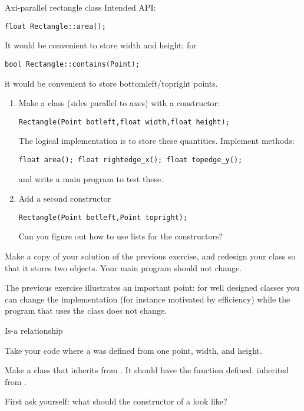 \begin{block}{Axi-parallel rectangle class}
  \label{ex:geom:rect}
  Intended API:
\begin{lstlisting}
float Rectangle::area();
\end{lstlisting}
It would be convenient to store width and height; for 
\begin{lstlisting}
bool Rectangle::contains(Point);  
\end{lstlisting}
it would be convenient to store bottomleft/topright points.
\end{block}

\begin{exercise}
  \label{ex:geom:rect2}
  \footnotesize
  \begin{enumerate}
  \item
    Make a class  (sides parallel to axes) with a constructor:
\begin{lstlisting}
Rectangle(Point botleft,float width,float height);
\end{lstlisting}
The logical implementation is to store these quantities.
Implement methods:
\begin{lstlisting}
float area(); float rightedge_x(); float topedge_y();
\end{lstlisting}
and write a main program to test these.
\item Add a second constructor
\begin{lstlisting}
Rectangle(Point botleft,Point topright);
\end{lstlisting}
Can you figure out how to use  lists for the constructors?
\end{enumerate}
\end{exercise}

\begin{exercise}
  \label{ex:geom:rect3}
  Make a copy of your solution of the previous exercise,
  and redesign your class so that it
  stores two  objects.
  Your main program should not change.
\end{exercise}


The previous exercise illustrates an important point: for well
designed classes you can change the implementation (for instance motivated
by efficiency) while the program that uses the class does not change.

 {Is-a relationship}
\label{sec:geom-isa}


\begin{exercise}
  \label{ex:geom:square}
  Take your code where a  was defined from one point,
  width, and height.

  Make a class  that inherits from . It should
  have the function  defined, inherited from .

  First ask yourself: what should the constructor of a  look like?
\end{exercise}

